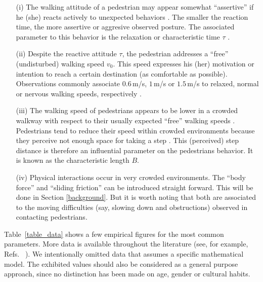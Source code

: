 \documentclass[preprint,12pt]{elsarticle}
\begin{document}
\begin{itemize}
\item[(i)] The walking attitude of a pedestrian may appear somewhat 
``assertive'' if he (she) reacts actively to unexpected behaviors 
\cite{lakoba_2005,helbing_1995}. The smaller the reaction time, the more 
assertive or aggresive observed posture. The associated parameter to this 
behavior is the relaxation or characteristic time $\tau$ 
\cite{johansson_2009,helbing_2000}. 

\item[(ii)] Despite the reactive attitude $\tau$, the pedestrian addresses a 
``free'' (undisturbed) walking speed $v_0$. This speed expresses his (her) 
motivation or intention to reach a certain destination (as comfortable as 
possible). Observations commonly associate $0.6\,$m/s, $1\,$m/s or $1.5\,$m/s 
to relaxed, normal or nervous walking speeds, respectively  
\cite{helbing_1995,helbing_2000,li_2015}. 

\item[(iii)] The walking speed of pedestrians appears to be lower in a 
crowded walkway with respect to their usually expected ``free'' walking speeds 
\cite{weidmann_1992,lakoba_2005}. Pedestrians tend to reduce their speed within 
crowded environments because they perceive not enough space for taking a 
step  \cite{johansson_2009}. This (perceived) step distance is therefore an 
influential parameter on the pedestrians behavior. It is known as the 
characteristic length $B$. 

\item[(iv)] Physical interactions occur in very crowded environments. The 
``body force''  and ``sliding friction'' can be introduced straight forward. 
This will be done in Section \ref{background}. But it is worth noting that 
both are associated to the moving difficulties (say, slowing down and 
obstructions) observed in contacting pedestrians. 

\end{itemize}


Table~\ref{table_data} shows a few empirical figures for the most common 
parameters. More data is available throughout the literature (see, for example, 
Refs.~\cite{hoogendoorn_2007,seyfried_2007,johansson_2007,moussaid_2009,
luber_2010,seer_2014,li_2015} ). We intentionally omitted data that assumes a 
specific mathematical model. The exhibited values should also be considered as a 
general purpose approach, since no distinction has been made on age, gender or 
cultural habits. \\
\end{document}
